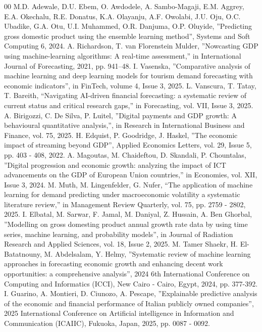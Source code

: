 \documentclass[12pt]{article}
\begin{document}
\begin{thebibliography}{00}
 M.D. Adewale, D.U. Ebem, O. Awdodele, A. Sambo-Magaji, E.M. Aggrey, E.A. Okechalu, R.E. Donatus, K.A. Olayanju, A.F. Owolabi, J.U. Oju, O.C. Ubadike, G.A. Otu, U.I. Muhammed, O.R. Danjuma, O.P. Oluyide, ''Predicting gross domestic product using the ensemble learning method'', Systems and Soft Computing 6, 2024.
 A. Richardson, T. van Florenstein Mulder, ''Nowcasting GDP using machine-learning algorithms: A real-time assessment,'' in International Journal of Forecasting, 2021, pp. 941--48.
 I. Vasenska, ''Comparative analysis of machine learning and deep learning models for tourism demand forecasting with economic indicators'', in FinTech, volume 4, Issue 3, 2025.
 L. Vanscura, T. Tatay, T. Bareith, ``Navigating AI-driven financial forecasting: a systematic review of current status and critical research gaps,'' in Forecasting, vol. VII, Issue 3, 2025.
 A. Birigozzi, C. De Silva, P. Luitel, ''Digital payments and GDP growth: A behavioural quantitative analysis,'', in Research in International Business and Finance, vol. 75, 2025.
 H. Edquist, P. Goodridge, J. Haskel, ''The economic impact of streaming beyond GDP'', Applied Economics Letters, vol. 29, Issue 5, pp. 403 - 408, 2022.
 A. Magoutas, M. Chaideftou, D. Skandali, P. Chountalas, ''Digital progression and economic growth: analyzing the impact of ICT advancements on the GDP of European Union countries,'' in Economies, vol. XII, Issue 3, 2024.
 M. Muth, M. Lingenfelder, G. Nufer, ``The application of machine learning for demand predicting under macroeconomic volatility a systematic literature review,'' in Management Review Quarterly, vol. 75, pp. 2759 - 2802, 2025.
 I. Elbatal, M. Sarwar, F. Jamal, M. Daniyal, Z. Hussain, A. Ben Ghorbal, ''Modelling on gross domesting product annual growth rate data by using time series, machine learning, and probability models'', in Journal of Radiation Research and Applied Sciences, vol. 18, Issue 2, 2025.
 M. Tamer Shaekr, H. El-Batatnouny, M. Abdelsalam, Y. Helmy, ''Systematic review of machine learning approaches in forecasting economic growth and enhancing decent work opportunities: a comprehensive analysis'', 2024 6th International Conference on Computing and Informatics (ICCI), New Cairo - Cairo, Egypt, 2024, pp. 377-392.
 I. Guarino, A. Montieri, D. Ciunozo, A. Pescape, ''Explainable predictive analysis of the economic and financial performance of Italian publicly owned companies'', 2025 International Conference on Artificial intelligence in Information and Communication (ICAIIC), Fukuoka, Japan, 2025, pp. 0087 - 0092.
\end{thebibliography}
\end{document}
